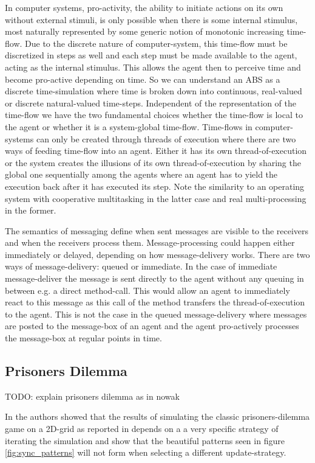 In computer systems, pro-activity, the ability to initiate actions on its own without external stimuli, is only possible when there is some internal stimulus, most naturally represented by some generic notion of monotonic increasing time-flow. Due to the discrete nature of computer-system, this time-flow must be discretized in steps as well and each step must be made available to the agent, acting as the internal stimulus. This allows the agent then to perceive time and become pro-active depending on time. So we can understand an ABS as a discrete time-simulation where time is broken down into continuous, real-valued or discrete natural-valued time-steps. Independent of the representation of the time-flow we have the two fundamental choices whether the time-flow is local to the agent or whether it is a system-global time-flow. Time-flows in computer-systems can only be created through threads of execution where there are two ways of feeding time-flow into an agent. Either it has its own thread-of-execution or the system creates the illusions of its own thread-of-execution by sharing the global one sequentially among the agents where an agent has to yield the execution back after it has executed its step. Note the similarity to an operating system with cooperative multitasking in the latter case and real multi-processing in the former.

\medskip 

The semantics of messaging define when sent messages are visible to the receivers and when the receivers process them. Message-processing could happen either immediately or delayed, depending on how message-delivery works. There are two ways of message-delivery: queued or immediate. In the case of immediate message-deliver the message is sent directly to the agent without any queuing in between e.g. a direct method-call. This would allow an agent to immediately react to this message as this call of the method transfers the thread-of-execution to the agent. This is not the case in the queued message-delivery where messages are posted to the message-box of an agent and the agent pro-actively processes the message-box at regular points in time.

\subsection{Prisoners Dilemma}
TODO: explain prisoners dilemma as in nowak

In \cite{huberman_evolutionary_1993} the authors showed that the results of simulating the classic prisoners-dilemma game on a 2D-grid as reported in \cite{nowak_evolutionary_1992} depends on a a very specific strategy of iterating the simulation and show that the beautiful patterns seen in figure \ref{fig:sync_patterns} will not form when selecting a different update-strategy.

